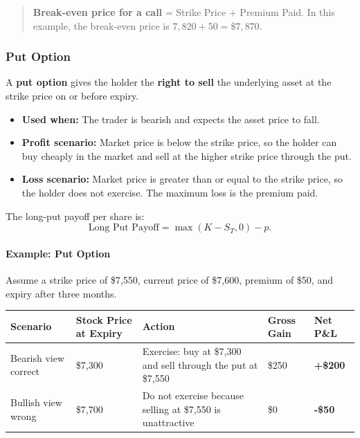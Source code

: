 \documentclass[12pt,openany]{book}
\begin{document}
\begin{quote}
\textbf{Break-even price for a call} = Strike Price + Premium Paid. In this example, the break-even price is \(7{,}820 + 50 = \$7{,}870\).
\end{quote}

\subsubsection{Put Option}

A \textbf{put option} gives the holder the \textbf{right to sell} the underlying asset at the strike price on or before expiry.

\begin{itemize}[leftmargin=*]
    \item \textbf{Used when:} The trader is bearish and expects the asset price to fall.
    \item \textbf{Profit scenario:} Market price is below the strike price, so the holder can buy cheaply in the market and sell at the higher strike price through the put.
    \item \textbf{Loss scenario:} Market price is greater than or equal to the strike price, so the holder does not exercise. The maximum loss is the premium paid.
\end{itemize}

The long-put payoff per share is:
\begin{equation*}
    \text{Long Put Payoff} = \max(K - S_T, 0) - p.
\end{equation*}

\paragraph{Example: Put Option}
Assume a strike price of \$7,550, current price of \$7,600, premium of \$50, and expiry after three months.

\begin{center}
\scriptsize
\setlength{\tabcolsep}{3pt}
\begin{tabular}{|L{2.1cm}|L{2.25cm}|L{4.35cm}|L{1.8cm}|L{2.0cm}|}
\hline
\textbf{Scenario} & \textbf{Stock Price at Expiry} & \textbf{Action} & \textbf{Gross Gain} & \textbf{Net P\&L} \\
\hline
Bearish view correct & \$7,300 & Exercise: buy at \$7,300 and sell through the put at \$7,550 & \$250 & \textbf{+\$200} \\
\hline
Bullish view wrong & \$7,700 & Do not exercise because selling at \$7,550 is unattractive & \$0 & \textbf{-\$50} \\
\hline
\end{tabular}
\end{center}
\end{document}
